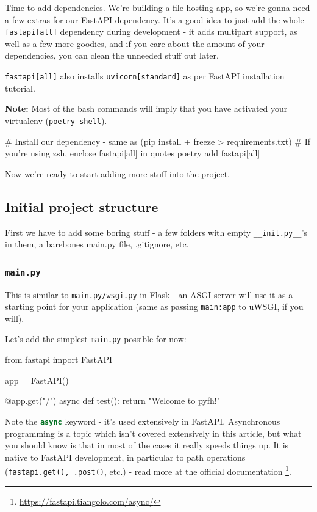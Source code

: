 \documentclass[14pt]{extarticle}
\newcommand{\flink}[1]{\footnote{\href{#1}{#1}}}
\newcommand{\note}{\textbf{\color{red}Note: }}
\newcommand{\pyinline}[1]{\lstinline[language=Python, style=cstyle, morekeywords={async}, basicstyle=\ttfamily\normalsize]{#1}}
\newcommand{\bashinline}[1]{\lstinline[language=bash, style=cstyle, morekeywords={docker, poetry, git, mv, python, uvicorn}, basicstyle=\ttfamily\normalsize]{#1}}
\begin{document}
Time to add dependencies. We're building a file hosting app, so we're gonna need a few extras for our FastAPI dependency. It's a good idea to just add the whole \texttt{fastapi[all]} dependency during development - it adds multipart support, as well as a few more goodies, and if you care about the amount of your dependencies, you can clean the unneeded stuff out later.

\texttt{fastapi[all]} also installs \texttt{uvicorn[standard]} as per FastAPI installation tutorial.

\note Most of the bash commands will imply that you have activated your virtualenv (\bashinline{poetry shell}).

\begin{bashcode}
    # Install our dependency - same as (pip install + freeze > requirements.txt)
    # If you're using zsh, enclose fastapi[all] in quotes
    poetry add fastapi[all]
\end{bashcode}

Now we're ready to start adding more stuff into the project.

\subsection{Initial project structure}

First we have to add some boring stuff - a few folders with empty \texttt{\_\_init.py\_\_}'s in them, a barebones main.py file, .gitignore, etc.

\subsubsection{\texttt{main.py}}

This is similar to \texttt{main.py/wsgi.py} in Flask - an ASGI server will use it as a starting point for your application (same as passing \texttt{main:app} to uWSGI, if you will).

Let's add the simplest \texttt{main.py} possible for now:

\begin{pycode}
    from fastapi import FastAPI

    app = FastAPI()

    @app.get("/")
    async def test():
        return "Welcome to pyfh!"
\end{pycode}

Note the \pyinline{async} keyword - it's used extensively in FastAPI. Asynchronous programming is a topic which isn't covered extensively in this article, but what you should know is that in most of the cases it really speeds things up. It is native to FastAPI development, in particular to path operations (\pyinline{fastapi.get(), .post()}, etc.) - read more at the official documentation \flink{https://fastapi.tiangolo.com/async/}.
\end{document}
